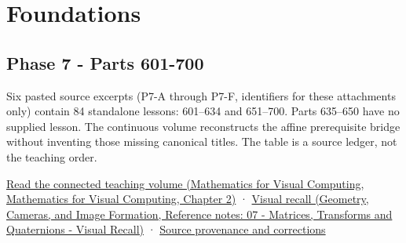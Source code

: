 \hypertarget{appendix-fd090d982a15}{}\label{referencestart:appendix-fd090d982a15}
\section{Foundations}\label{appendix-fd090d982a15-foundations}

\subsection{Phase 7 - Parts 601-700}\label{appendix-fd090d982a15-phase-7---parts-601-700}

Six pasted source excerpts (P7-A through P7-F, identifiers for these attachments only) contain 84 standalone lessons: 601--634 and 651--700. Parts 635--650 have no supplied lesson. The continuous volume reconstructs the affine prerequisite bridge without inventing those missing canonical titles. The table is a source ledger, not the teaching order.

\href{../02-Mathematics-for-Visual-Computing/main.pdf\#nameddest=01-foundations-i-ch018-keep-the-promises-visible-while-moving-between-representations}{Read the connected teaching volume (Mathematics for Visual Computing, Mathematics for Visual Computing, Chapter 2)} · \href{../03-Geometry-Cameras-and-Image-Formation/main.pdf\#nameddest=appendix-68f22c734be3}{Visual recall (Geometry, Cameras, and Image Formation, Reference notes: 07 - Matrices, Transforms and Quaternions - Visual Recall)} · \hyperref[appendix-a103e7846d21-phase-7---source-analysis-and-verification]{Source provenance and corrections}

